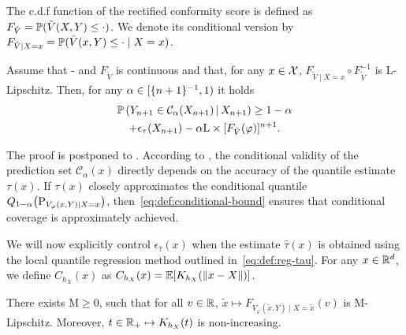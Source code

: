   The c.d.f function of the rectified conformity score is defined as $F_{\tilde{V}} = \mathbb{P}(\tilde{V}(X,Y)\le \cdot)$.  We denote its conditional version by $F_{\tilde{V}\mid X=x} = \mathbb{P}(\tilde{V}(x,Y)\le \cdot \mid X=x)$.
  \begin{theorem}\label{thm:coverage:conditional}
    Assume that - and $F_{\tilde{V}}$ is continuous and that, for any $x \in \mathcal{X}$, $F_{\tilde{V}\mid X=x}\circ F_{\tilde{V}}^{-1}$ is $\mathrm{L}$-Lipschitz. Then, for any $\alpha\in[\{n+1\}^{-1},1)$  it holds
    \begin{multline}\label{eq:def:conditional-bound}
      \mathbb{P}\left({Y_{n+1}\in \mathcal{C}_{\alpha}(X_{n+1}) \,\vert\, X_{n+1}}\right)
      \ge 1 - \alpha 
      \\
      + \epsilon_{\tau}(X_{n+1})
      - \alpha \mathrm{L} \times [{F_{\tilde{V}}(\varphi)}]^{n+1}.
    \end{multline}
  \end{theorem}
  The proof is postponed to .
  According to , the conditional validity of the prediction set \(\mathcal{C}_{\alpha}(x)\) directly depends on the accuracy of the quantile estimate \(\tau(x)\). If \(\tau(x)\) closely approximates the conditional quantile \(Q_{1-\alpha}\bigl( \textup{P}_{V_\varphi(x,Y)\mid X=x} \bigr)\), then~\eqref{eq:def:conditional-bound} ensures that conditional coverage is approximately achieved.


  We will now explicitly control \(\epsilon_{\widehat{\tau}}(x)\) when the estimate $\widehat{\tau}(x)$ is obtained using the local quantile regression method outlined in~\eqref{eq:def:reg-tau}. For any \(x \in \mathbb{R}^d\), we define $C_{h_{X}}(x)$ as $C_{h_{X}}(x) = \mathbb{E}[K_{h_{X}}(\|x - X\|)]$.

  \begin{assumption}\label{ass:kernel-cdf}
    There exists $\mathrm{M}\ge 0$, such that for all $v\in\mathbb{R}$, $\tilde{x}\mapsto F_{V_\varphi(\tilde{x},Y)\mid X=\tilde{x}}(v)$ is $\mathrm{M}$-Lipschitz.
    Moreover, $t\in\mathbb{R}_+\mapsto K_{h_{X}}(t)$ is non-increasing.
  \end{assumption}

